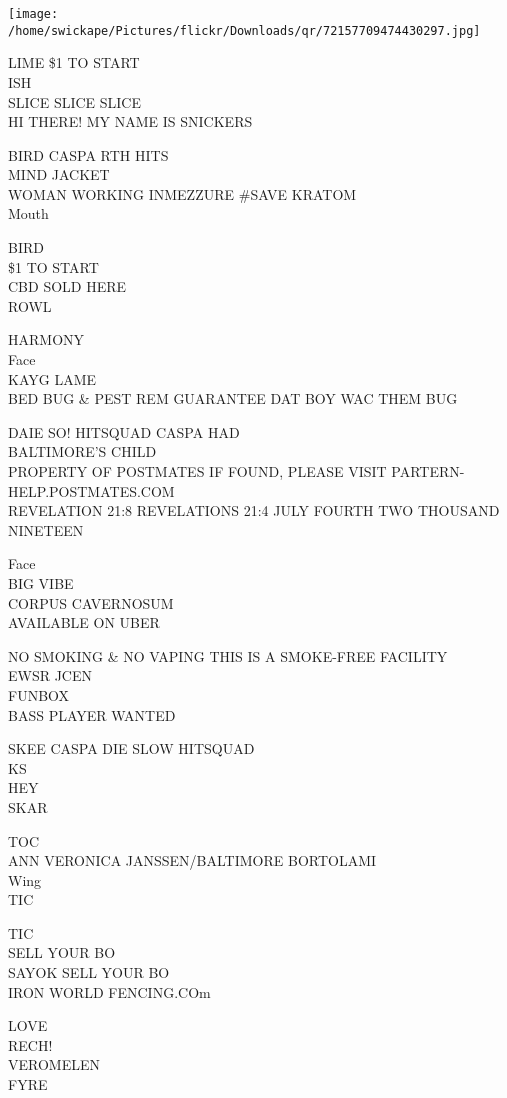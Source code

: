 \documentclass[10pt,letterpaper]{article}
\begin{document}
\texttt{[image: /home/swickape/Pictures/flickr/Downloads/qr/72157709474430297.jpg]}


LIME \$1 TO START\\
ISH\\
SLICE SLICE SLICE\\
HI THERE!  MY NAME IS SNICKERS

BIRD CASPA RTH HITS\\
MIND JACKET\\
WOMAN WORKING INMEZZURE \#SAVE KRATOM\\
Mouth

BIRD\\
\$1 TO START\\
CBD SOLD HERE\\
ROWL

HARMONY\\
Face\\
KAYG LAME\\
BED BUG \& PEST REM GUARANTEE DAT BOY WAC THEM BUG

DAIE SO! HITSQUAD CASPA HAD\\
BALTIMORE'S CHILD\\
PROPERTY OF POSTMATES IF FOUND, PLEASE VISIT PARTERN{-}HELP.POSTMATES.COM\\
REVELATION 21:8 REVELATIONS 21:4 JULY FOURTH TWO THOUSAND NINETEEN

Face\\
BIG VIBE\\
CORPUS CAVERNOSUM\\
AVAILABLE ON UBER

NO SMOKING \& NO VAPING THIS IS A SMOKE{-}FREE FACILITY\\
EWSR JCEN\\
FUNBOX\\
BASS PLAYER WANTED

SKEE CASPA DIE SLOW HITSQUAD\\
KS\\
HEY\\
SKAR

TOC\\
ANN VERONICA JANSSEN/BALTIMORE BORTOLAMI\\
Wing\\
TIC

TIC\\
SELL YOUR BO\\
SAYOK SELL YOUR BO\\
IRON WORLD FENCING.COm

LOVE\\
RECH!\\
VEROMELEN\\
FYRE
\end{document}
